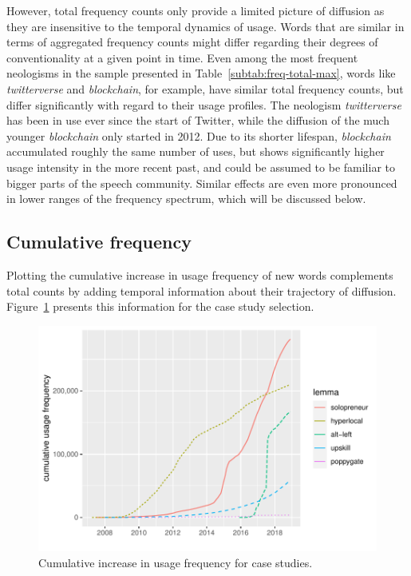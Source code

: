 \documentclass[
  a4paper,
  abstract=on,
  captions=tableabove
  ]{scrartcl}
\begin{document}
  However, total frequency counts only provide a limited picture of diffusion as they are insensitive to the temporal dynamics of usage. Words that are similar in terms of aggregated frequency counts might differ regarding their degrees of conventionality at a given point in time. Even among the most frequent neologisms in the sample presented in Table~\ref{subtab:freq-total-max}, words like \emph{twitterverse} and \emph{blockchain}, for example, have similar total frequency counts, but differ significantly with regard to their usage profiles. The neologism \emph{twitterverse} has been in use ever since the start of Twitter, while the diffusion of the much younger \emph{blockchain} only started in 2012. Due to its shorter lifespan, \emph{blockchain} accumulated roughly the same number of uses, but shows significantly higher usage intensity in the more recent past, and could be assumed to be familiar to bigger parts of the speech community. Similar effects are even more pronounced in lower ranges of the frequency spectrum, which will be discussed below.

    \subsection{Cumulative frequency}

Plotting the cumulative increase in usage frequency of new words complements total counts by adding temporal information about their trajectory of diffusion. Figure~\ref{fig:freq_cum_cases} presents this information for the case study selection.

  \begin{figure}
    \caption{Cumulative increase in usage frequency for case studies.\protect\footnotemark}
    \label{fig:freq_cum_cases}
    \includegraphics[width=\linewidth, height=.8\textheight, keepaspectratio]{img/freq_cum_cases.pdf}
    \centering
  \end{figure}
\end{document}
